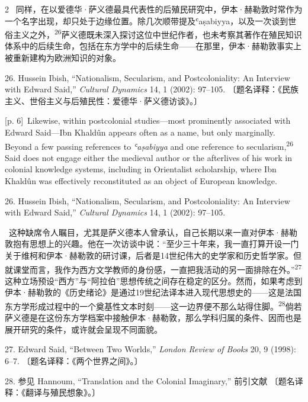 \documentclass[10pt,a4paper]{article}
\begin{document}
\begin{paracol}{2}
\switchcolumn*
{\scriptsize\color{gray} [p. 6]}\ 同样，在以爱德华·萨义德最具代表性的后殖民研究中，伊本·赫勒敦时常作为一个名字出现，却只处于边缘位置。除几次顺带提及ʿaṣabiyya，以及一次谈到世俗主义之外，\nobreak\textsuperscript{26}萨义德既未深入探讨这位中世纪作者，也未考察其著作在殖民知识体系中的后续生命，包括在东方学中的后续生命——在那里，伊本·赫勒敦事实上被重新建构为欧洲知识的对象。\par{\small 26. Hussein Ibish, “Nationalism, Secularism, and Postcoloniality: An Interview with Edward Said,” \textit{Cultural Dynamics} 14, 1 (2002): 97–105. 〔题名译释：《民族主义、世俗主义与后殖民性：爱德华·萨义德访谈》。〕\par}
\switchcolumn
{\scriptsize\color{gray} [p. 6]}\ Likewise, within postcolonial studies—most prominently associated with Edward Said—Ibn Khaldûn appears often as a name, but only marginally. Beyond a few passing references to \textit{ʿaṣabiyya} and one reference to secularism,\nobreak\textsuperscript{26} Said does not engage either the medieval author or the afterlives of his work in colonial knowledge systems, including in Orientalist scholarship, where Ibn Khaldûn was effectively reconstituted as an object of European knowledge.\par{\small 26. Hussein Ibish, “Nationalism, Secularism, and Postcoloniality: An Interview with Edward Said,” \textit{Cultural Dynamics} 14, 1 (2002): 97–105.\par}
\switchcolumn*
{\scriptsize\color{gray} [p. 6]}\ 这种缺席令人瞩目，尤其是萨义德本人曾承认，自己长期以来一直对伊本·赫勒敦抱有思想上的兴趣。他在一次访谈中说：“至少三十年来，我一直打算开设一门关于维柯和伊本·赫勒敦的研讨课，后者是14世纪伟大的史学家和历史哲学家。但就课堂而言，我作为西方文学教师的身份感，一直把我活动的另一面排除在外。”\nobreak\textsuperscript{27}这种立场预设“西方”与“阿拉伯”思想传统之间存在稳定的区分。然而，如果考虑到伊本·赫勒敦的《历史绪论》是通过19世纪法译本进入现代思想史的——这是法国东方学形成过程中的一个奠基性文本时刻——这一边界便不那么站得住\mbox{脚。\textsuperscript{28}}倘若萨义德是在这份东方学档案中接触伊本·赫勒敦，那么学科归属的条件、因而也是展开研究的条件，或许就会呈现不同面貌。\par{\small 27. Edward Said, “Between Two Worlds,” \textit{London Review of Books} 20, 9 (1998): 6–7. 〔题名译释：《两个世界之间》。〕\par}{\small 28. 参见 Hannoum, “Translation and the Colonial Imaginary,” 前引文献 〔题名译释：《翻译与殖民想象》。〕\par}
\switchcolumn

\end{paracol}
\end{document}
